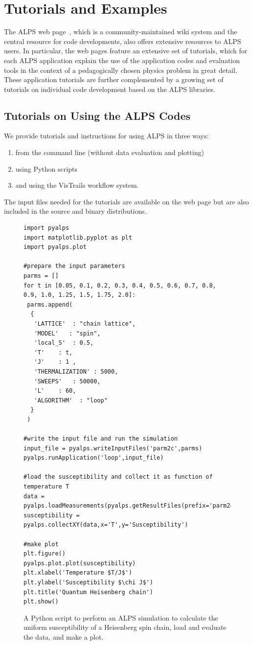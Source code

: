 \documentclass[12pt]{iopart}
\begin{document}
\section{Tutorials and Examples}

The ALPS web page~\cite{alps}, which is a community-maintained wiki system and the central resource for code developments, 
also offers extensive resources to ALPS users. In particular, the web pages feature an extensive set of tutorials, which for each ALPS application 
explain the use of the application codes and evaluation tools in the context of a pedagogically chosen physics problem in great detail.
These application tutorials are further complemented by a growing set of tutorials on individual code development based on the ALPS libraries.

\subsection{Tutorials on Using the ALPS Codes}
We provide tutorials and instructions for using ALPS in three ways: 
\begin{enumerate}
\item from the command line (without data evaluation and plotting)
\item using Python scripts
\item and using the VisTrails workflow system. 
\end{enumerate}

The input files needed for the tutorials are available on the web page but are also included in the source and binary distributions.



\begin{figure}
\begin{lstlisting}
import pyalps
import matplotlib.pyplot as plt
import pyalps.plot

#prepare the input parameters
parms = []
for t in [0.05, 0.1, 0.2, 0.3, 0.4, 0.5, 0.6, 0.7, 0.8, 0.9, 1.0, 1.25, 1.5, 1.75, 2.0]:
 parms.append(
  { 
   'LATTICE'  : "chain lattice", 
   'MODEL'   : "spin",
   'local_S'  : 0.5,
   'T'    : t,
   'J'    : 1 ,
   'THERMALIZATION' : 5000,
   'SWEEPS'   : 50000,
   'L'    : 60,
   'ALGORITHM'  : "loop"
  }
 )

#write the input file and run the simulation
input_file = pyalps.writeInputFiles('parm2c',parms)
pyalps.runApplication('loop',input_file)

#load the susceptibility and collect it as function of temperature T
data = pyalps.loadMeasurements(pyalps.getResultFiles(prefix='parm2c'),'Susceptibility')
susceptibility = pyalps.collectXY(data,x='T',y='Susceptibility')

#make plot
plt.figure()
pyalps.plot.plot(susceptibility)
plt.xlabel('Temperature $T/J$')
plt.ylabel('Susceptibility $\chi J$')
plt.title('Quantum Heisenberg chain')
plt.show()
\end{lstlisting}
\caption{A Python script to perform an ALPS simulation to calculate the uniform susceptibility of a Heisenberg spin chain, load and evaluate the data, and make a plot. }
\label{fig:python}
\end{figure}
\end{document}
